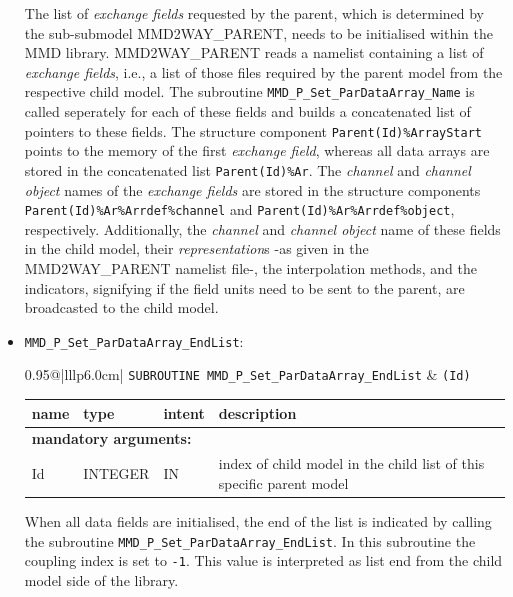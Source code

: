 \documentclass[twoside]{article}
\begin{document}
\begin{itemize}
The list of {\it exchange fields} requested by the parent,
which is determined by the sub-submodel MMD2WAY\_PARENT, needs to be
initialised within the MMD library. MMD2WAY\_PARENT reads a namelist
containing a list of {\it exchange fields}, i.e., a list of those
files required by the parent model from the respective child model.
The subroutine \verb|MMD_P_Set_ParDataArray_Name| is called seperately
for each of these fields and builds a concatenated list of pointers to
these fields.
The structure component \verb|Parent(Id)%ArrayStart| points to the
memory of the first {\it exchange field}, whereas all data arrays are
stored in the concatenated list \verb|Parent(Id)%Ar|. The {\it
channel} and {\it channel object} names of the {\it exchange fields}
are stored in the structure components 
\verb|Parent(Id)%Ar%Arrdef%channel|
and \verb|Parent(Id)%Ar%Arrdef%object|, respectively.
Additionally, the {\it channel} and {\it channel object} name of these
fields in the child model, their {\it representation}s -as given in the
MMD2WAY\_PARENT namelist file-, the interpolation methods, and the
indicators, signifying if the field units need to be sent to the parent, are
broadcasted to the child model. 

\item  \verb|MMD_P_Set_ParDataArray_EndList|:\\
\vspace*{-0.3cm}

\begin{tabular*}{0.95\textwidth}{@{\extracolsep\fill}|lllp{6.0cm}|}
\hline
{}
{\tt SUBROUTINE MMD\_P\_Set\_ParDataArray\_EndList} &
{\tt (Id)}\\
\hline
\end{tabular*}
\begin{tabular*}{0.95\textwidth}{@{\extracolsep\fill}|lllp{7.5cm}|}
name & type & intent & description\\
\hline
\multicolumn{4}{|l|}{\bf mandatory arguments:}\\
Id & {\footnotesize INTEGER} & IN &  index of child model in the child
list of this specific parent model \\
\hline
\end{tabular*}
\smallskip

When all data fields are initialised, the end of the list is indicated by 
calling the subroutine \verb|MMD_P_Set_ParDataArray_EndList|.
In this subroutine the coupling index is set to \verb|-1|. This value is 
interpreted as list end from the child model side of the library.


\end{itemize}
\end{document}
